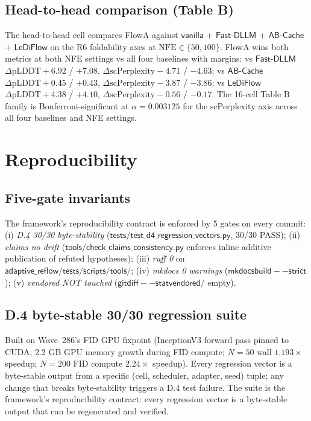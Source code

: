 \documentclass[journal,twocolumn,final]{IEEEtran}
\newcommand{\NFE}{\mathrm{NFE}}
\newcommand{\pLDDT}{\mathrm{pLDDT}}
\newcommand{\scPerp}{\mathrm{scPerplexity}}
\begin{document}
\subsection{Head-to-head comparison (Table B)}

The head-to-head cell compares FlowA against $\mathsf{vanilla}$ +
$\mathsf{Fast\text{-}DLLM}$ + $\mathsf{AB\text{-}Cache}$ + $\mathsf{LeDiFlow}$
on the R6 foldability axes at $\NFE \in \{50, 100\}$. FlowA wins both metrics
at both NFE settings vs all four baselines with margins: vs $\mathsf{Fast\text{-}DLLM}$
$\Delta\pLDDT +6.92$ / $+7.08$, $\Delta\scPerp -4.71$ / $-4.63$; vs
$\mathsf{AB\text{-}Cache}$ $\Delta\pLDDT +0.45$ / $+0.43$, $\Delta\scPerp -3.87$
/ $-3.86$; vs $\mathsf{LeDiFlow}$ $\Delta\pLDDT +4.38$ / $+4.10$,
$\Delta\scPerp -0.56$ / $-0.17$. The 16-cell Table B family is Bonferroni-significant
at $\alpha = 0.003125$ for the $\scPerp$ axis across all four baselines and
NFE settings.

\section{Reproducibility}\label{sec:reproducibility}

\subsection{Five-gate invariants}

The framework's reproducibility contract is enforced by 5 gates on every
commit: (i) \emph{D.4 30/30 byte-stability} ($\mathsf{tests/test\_d4\_regression\_vectors.py}$,
30/30 PASS); (ii) \emph{claims no drift}
($\mathsf{tools/check\_claims\_consistency.py}$ enforces inline additive
publication of refuted hypotheses); (iii) \emph{ruff 0} on
$\mathsf{adaptive\_reflow/ tests/ scripts/ tools/}$; (iv) \emph{mkdocs 0
warnings} ($\mathsf{mkdocs build --strict}$); (v) \emph{vendored NOT touched}
($\mathsf{git diff --stat vendored/}$ empty).

\subsection{D.4 byte-stable 30/30 regression suite}

Built on Wave~286's FID GPU fixpoint (InceptionV3 forward pass pinned to CUDA;
2.2 GB GPU memory growth during FID compute; $N=50$ wall $1.193\times$ speedup;
$N=200$ FID compute $2.24\times$ speedup). Every regression vector is a
byte-stable output from a specific (cell, scheduler, adapter, seed) tuple; any
change that breaks byte-stability triggers a D.4 test failure. The suite is the
framework's reproducibility contract: every regression vector is a
byte-stable output that can be regenerated and verified.
\end{document}
